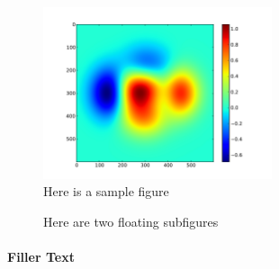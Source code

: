 %
\begin{figure}[hbtp]
\centering
\includegraphics[width=0.6\textwidth]{Chapter-2/figs/color}
\caption{Here is a sample figure}
\label{fig:hist2}
\end{figure}
%
\begin{figure}[hbtp]
\centering
{}
\caption{Here are two floating subfigures}
\label{fig:subfigures}
\end{figure}


\paragraph{Filler Text} \lipsum[12-15]


